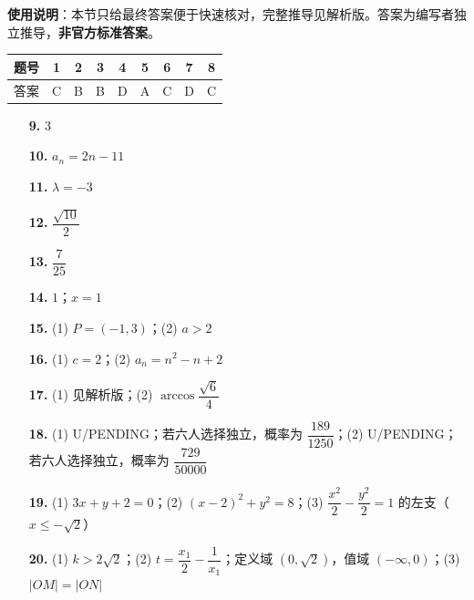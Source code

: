 
\begin{gknotice}
\textbf{使用说明}：本节只给最终答案便于快速核对，完整推导见解析版。答案为编写者独立推导，\textbf{非官方标准答案}。
\end{gknotice}

\begin{center}\begin{tabular}{ccccccccc}
\toprule
题号 & 1 & 2 & 3 & 4 & 5 & 6 & 7 & 8 \\
\midrule
答案 & C & B & B & D & A & C & D & C \\
\bottomrule
\end{tabular}\end{center}

\begin{itemize}[leftmargin=2.6em]
  \item[\textbf{9.}] $3$
  \item[\textbf{10.}] $a_n=2n-11$
  \item[\textbf{11.}] $\lambda=-3$
  \item[\textbf{12.}] $\dfrac{\sqrt{10}}2$
  \item[\textbf{13.}] $\dfrac7{25}$
  \item[\textbf{14.}] $1$；$x=1$
  \item[\textbf{15.}] (1) $P=(-1,3)$；(2) $a>2$
  \item[\textbf{16.}] (1) $c=2$；(2) $a_n=n^2-n+2$
\end{itemize}

\begin{itemize}[leftmargin=2.6em]
  \item[\textbf{17.}] (1) 见解析版；(2) $\arccos\dfrac{\sqrt6}{4}$
  \item[\textbf{18.}] (1) U/PENDING；若六人选择独立，概率为 $\dfrac{189}{1250}$；(2) U/PENDING；若六人选择独立，概率为 $\dfrac{729}{50000}$
  \item[\textbf{19.}] (1) $3x+y+2=0$；(2) $(x-2)^2+y^2=8$；(3) $\dfrac{x^2}{2}-\dfrac{y^2}{2}=1$ 的左支（$x\leq-\sqrt2$）
  \item[\textbf{20.}] (1) $k>2\sqrt2$；(2) $t=\dfrac{x_1}{2}-\dfrac1{x_1}$；定义域 $(0,\sqrt2)$，值域 $(-\infty,0)$；(3) $|OM|=|ON|$
\end{itemize}
